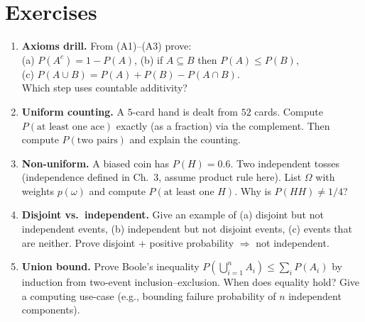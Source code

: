 \section{Exercises}
\label{sec:ch02-exercises}
\begin{enumerate}[label=E2.\arabic*, leftmargin=*, itemsep=0.8em]
\item \textbf{Axioms drill.} From (A1)--(A3) prove:\\
(a) $P(A^c)=1-P(A)$, (b) if $A\subseteq B$ then $P(A)\le P(B)$,\\
(c) $P(A\cup B)=P(A)+P(B)-P(A\cap B)$.\\
Which step uses countable additivity?
\item \textbf{Uniform counting.} A $5$-card hand is dealt from $52$ cards. Compute $P(\text{at least one ace})$ exactly (as a fraction) via the complement. Then compute $P(\text{two pairs})$ and explain the counting.
\item \textbf{Non-uniform.} A biased coin has $P(H)=0.6$. Two independent tosses (independence defined in Ch.~3, assume product rule here). List $\Omega$ with weights $p(\omega)$ and compute $P(\text{at least one }H)$. Why is $P(HH)\ne1/4$?
\item \textbf{Disjoint vs.\ independent.} Give an example of (a) disjoint but not independent events, (b) independent but not disjoint events, (c) events that are neither. Prove disjoint + positive probability $\Rightarrow$ not independent.
\item \textbf{Union bound.} Prove Boole's inequality $P(\bigcup_{i=1}^n A_i)\le\sum_i P(A_i)$ by induction from two-event inclusion--exclusion. When does equality hold? Give a computing use-case (e.g., bounding failure probability of $n$ independent components).
\end{enumerate}
